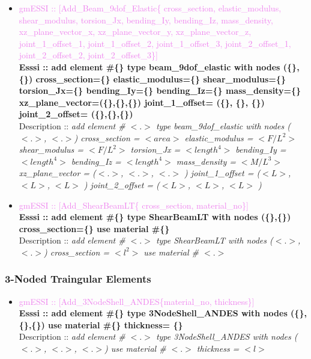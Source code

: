 \documentclass[11pt]{article}
\begin{document}
\begin{itemize}
    \item \textcolor{violet}{gmESSI :: [Add\_Beam\_9dof\_Elastic\{ cross\_section, elastic\_modulus, shear\_modulus, torsion\_Jx, bending\_Iy, bending\_Iz, mass\_density, xz\_plane\_vector\_x, xz\_plane\_vector\_y, xz\_plane\_vector\_z, joint\_1\_offset\_1, joint\_1\_offset\_2, joint\_1\_offset\_3, joint\_2\_offset\_1, joint\_2\_offset\_2, joint\_2\_offset\_3\}]} \\
    \textbf{Esssi :: add element \#\{\} type beam\_9dof\_elastic with nodes (\{\},\{\}) cross\_section=\{\} elastic\_modulus=\{\} shear\_modulus=\{\} torsion\_Jx=\{\} bending\_Iy=\{\} bending\_Iz=\{\} mass\_density=\{\}  xz\_plane\_vector=(\{\},\{\},\{\}) joint\_1\_offset= (\{\}, \{\}, \{\}) joint\_2\_offset= (\{\},\{\},\{\})}\\
    Description :: \textit{ add element \# $<.>$ type beam\_9dof\_elastic with nodes ($<.>$, $<.>$) cross\_section = $<area>$ elastic\_modulus = $<F/L^2>$ shear\_modulus = $<F/L^2>$ torsion\_Jx = $<length^4>$ bending\_Iy = $<length^4>$ bending\_Iz = $<length^4>$ mass\_density = $<M/L^3>$  xz\_plane\_vector = ($<.>$, $<.>$, $<.>$ ) joint\_1\_offset = ($<L>$, $<L>$, $<L>$ ) joint\_2\_offset = ($<L>$, $<L>$, $<L>$ )}

    \item \textcolor{violet}{gmESSI :: [Add\_ShearBeamLT\{ cross\_section, material\_no\}]} \\             
    \textbf{Esssi :: add element \#\{\} type ShearBeamLT with nodes (\{\},\{\}) cross_section=\{\} use material \#\{\}}\\
    Description :: \textit{ add element \# $<.>$ type ShearBeamLT with nodes ($<.>$, $<.>$) cross\_section = $<l^2>$ use material \# $<.>$}

  \end{itemize}

\subsubsection{3-Noded Traingular Elements}

  \begin{itemize}
    \item \textcolor{violet}{gmESSI :: [Add\_3NodeShell\_ANDES\{material\_no, thickness\}]} \\             
    \textbf{Esssi :: add element \#\{\} type 3NodeShell\_ANDES with nodes (\{\},\{\},\{\}) use material \#\{\} thickness= \{\}}\\
    Description :: \textit{ add element \# $<.>$ type 3NodeShell\_ANDES with nodes ($<.>$, $<.>$, $<.>$) use material \# $<.>$ thickness = $<l>$ }
  \end{itemize}
\end{document}
